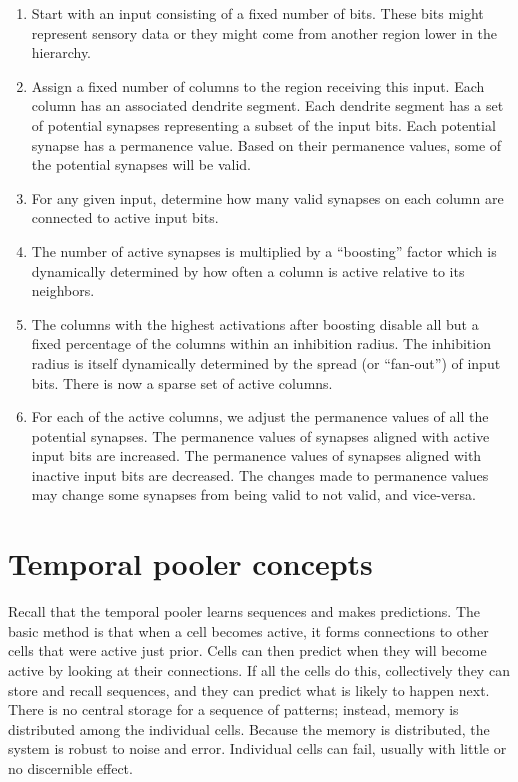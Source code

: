 \documentclass{report}
\begin{document}
\begin{enumerate}
\item Start with an input consisting of a fixed number of bits. These
  bits might represent sensory data or they might come from another
  region lower in the hierarchy.

\item Assign a fixed number of columns to the region receiving this
  input. Each column has an associated dendrite segment. Each dendrite
  segment has a set of potential synapses representing a subset of the
  input bits. Each potential synapse has a permanence value. Based on
  their permanence values, some of the potential synapses will be
  valid.

\item For any given input, determine how many valid synapses on each
  column are connected to active input bits.

\item The number of active synapses is multiplied by a ``boosting''
  factor which is dynamically determined by how often a column is
  active relative to its neighbors.

\item The columns with the highest activations after boosting disable
  all but a fixed percentage of the columns within an inhibition
  radius. The inhibition radius is itself dynamically determined by
  the spread (or ``fan-out'') of input bits. There is now a sparse set
  of active columns.

\item For each of the active columns, we adjust the permanence values
  of all the potential synapses. The permanence values of synapses
  aligned with active input bits are increased. The permanence values
  of synapses aligned with inactive input bits are decreased. The
  changes made to permanence values may change some synapses from
  being valid to not valid, and vice-versa.
\end{enumerate}

\section*{Temporal pooler concepts}

Recall that the temporal pooler learns sequences and makes
predictions. The basic method is that when a cell becomes active, it
forms connections to other cells that were active just prior. Cells
can then predict when they will become active by looking at their
connections. If all the cells do this, collectively they can store and
recall sequences, and they can predict what is likely to happen
next. There is no central storage for a sequence of patterns; instead,
memory is distributed among the individual cells. Because the memory
is distributed, the system is robust to noise and error. Individual
cells can fail, usually with little or no discernible effect.
\end{document}
